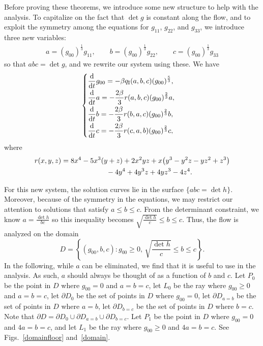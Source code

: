 \documentclass[10pt,a4paper]{amsart}
\numberwithin{equation}{section}
\newcommand{\dtime}{\frac{{\rm d}}{{\rm d} t}} %
\begin{document}
Before proving these theorems, we introduce some new structure to help with the analysis. To capitalize on the fact that $\det g$ is constant along the flow, and to exploit the symmetry among the equations for $g_{11}$, $g_{22}$, and $g_{33}$, we introduce three new variables:
\begin{gather*}
a = (g_{00})^{\frac{1}{3}} g_{11}, \qquad
b = (g_{00})^{\frac{1}{3}} g_{22}, \qquad
c = (g_{00})^{\frac{1}{3}} g_{33}
\end{gather*}
so that $abc = \det g$, and we rewrite our system using these.
We have
\begin{gather} \label{s3abcsystem}
\begin{cases}
\displaystyle \dtime g_{00} = -\beta q_{\rm I}(a, b, c) (g_{00})^{\frac{5}{3}}, \vspace{1mm}\\
\displaystyle \dtime a = -\frac{2 \beta}{3} r(a, b, c) (g_{00})^{\frac{2}{3}} a,\vspace{1mm} \\
\displaystyle \dtime b = -\frac{2 \beta}{3} r(b, a, c) (g_{00})^{\frac{2}{3}}b, \vspace{1mm}\\
\displaystyle \dtime c = -\frac{2 \beta}{3} r(c, a, b) (g_{00})^{\frac{2}{3}}c,
\end{cases}
\end{gather}
where
\begin{gather*}
r(x, y, z) = 8x^4 - 5x^3(y + z) + 2x^2yz
+ x\big(y^3 - y^2z - yz^2 + z^3\big) \\
\hphantom{r(x, y, z) =}{}
 -4y^4 + 4y^3z + 4yz^3 - 4z^4.
\end{gather*}

For this new system, the solution curves lie in the surface $\{a b c = \det h\}$. Moreover, because of the symmetry in the equations, we may restrict our attention to solutions that satisfy $a \leq b \leq c$.
From the determinant constraint, we know $a = \frac{\det h}{bc}$ so this inequality becomes $\sqrt{\frac{\det h}{c}} \leq b \leq c$.
Thus, the flow is analyzed on the domain
\[
D = \left\{ (g_{00}, b, c)\colon g_{00} \geq 0,\, \sqrt{\frac{\det h}{c}} \leq b \leq c \right\}.
\]
In the following, while $a$ can be eliminated, we find that it is useful to use in the analysis. As such, $a$ should always be thought of as a function of $b$ and $c$. Let $P_0$ be the point in $D$ where $g_{00} = 0$ and $a = b = c$, let $L_0$ be the ray where $g_{00} \geq 0$ and $a = b = c$, let $\partial D_0$ be the set of points in $D$ where $g_{00} = 0$, let $\partial D_{a = b}$ be the set of points in $D$ where $a = b$, let $\partial D_{b = c}$ be the set of points in $D$ where $b = c$. Note that $\partial D = \partial D_0 \cup \partial D_{a = b} \cup \partial D_{b = c}$. Let $P_1$ be the point in $D$ where $g_{00} = 0$ and $4a = b = c$, and let $L_1$ be the ray where $g_{00} \geq 0$ and $4a = b = c$. See Figs.~\ref{domainfloor} and~\ref{domain}.
\end{document}
